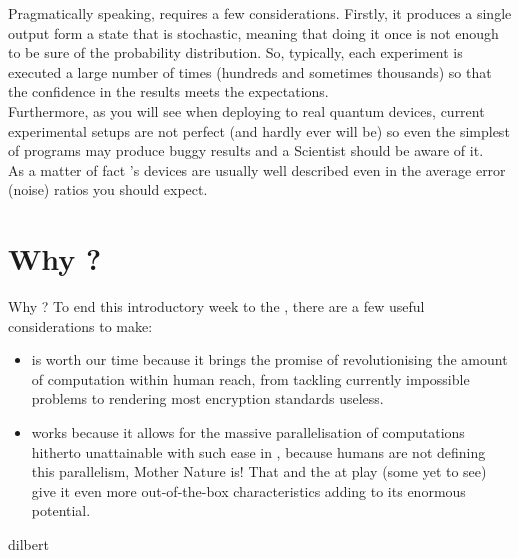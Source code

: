 \documentclass[aspectratio=43]{beamer}
\begin{document}
\begin{frame}{\qmt}
\begin{cardTiny}
\small{
    Pragmatically speaking, \qmt requires a few considerations. Firstly, it produces a single output form a state that is stochastic, meaning that doing it once is not enough to be sure of the probability distribution. So, typically, each experiment is executed a large number of times (hundreds and sometimes thousands) so that the confidence in the results meets the expectations.\\
    Furthermore, as you will see when deploying to real quantum devices, current experimental setups are not perfect (and hardly ever will be) so even the simplest of programs may produce buggy results and a \q Scientist should be aware of it.\\As a matter of fact \href{https://quantumexperience.ng.bluemix.net/qx/editor}{\ibmqe}'s devices are usually well described even in the average error (noise) ratios you should expect.
}
\end{cardTiny}
\pagenumber
\end{frame}

\section{Why \q?}
\begin{frame}{Why \q?}
    To end this introductory week to the \qw, there are a few useful considerations to make:
    \begin{itemize}
        \item \qc is worth our time because it brings the promise of revolutionising the amount of computation within human reach, from tackling currently impossible problems to rendering most encryption standards useless.
        \item \qc works because it allows for the massive parallelisation of computations hitherto unattainable with such ease in \cc, because humans are not defining this parallelism, Mother Nature is! That and the \qm at play (some yet to see) give it even more out-of-the-box characteristics adding to its enormous potential. 
    \end{itemize}
\pagenumber
\end{frame}

\begin{frameImg}[width]{dilbert}


\end{frameImg}
\end{document}
